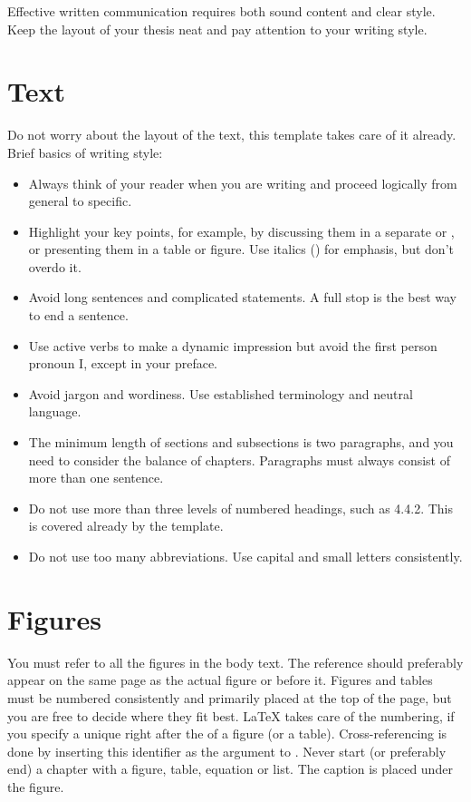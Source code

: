 Effective written communication requires both sound content and clear style. Keep the layout of your thesis neat and pay attention to your writing style.

\section{Text}

Do not worry about the layout of the text, this template takes care of it already. Brief basics of writing style:
\begin{itemize}
\item Always think of your reader when you are writing and proceed logically from general to specific.
\item Highlight your key points, for example, by discussing them in a separate  or , or presenting them in a table or figure. Use italics () for emphasis, but don’t overdo it.
\item Avoid long sentences and complicated statements. A full stop is the best way to end a sentence.
\item Use active verbs to make a dynamic impression but avoid the first person pronoun I, except in your preface.
\item Avoid jargon and wordiness. Use established terminology and neutral language.
\item The minimum length of sections and subsections is two paragraphs, and you need to consider the balance of chapters. Paragraphs must always consist of more than one sentence.
\item Do not use more than three levels of numbered headings, such as 4.4.2. This is covered already by the template.
\item Do not use too many abbreviations. Use capital and small letters consistently.
\end{itemize}

\section{Figures}

You must refer to all the figures in the body text. The reference should preferably appear on the same page as the actual figure or before it. Figures and tables must be numbered consistently and primarily placed at the top of the page, but you are free to decide where they fit best. \LaTeX{} takes care of the numbering, if you specify a unique  right after the  of a figure (or a table). Cross-referencing is done by inserting this identifier as the argument to . Never start (or preferably end) a chapter with a figure, table, equation or list. The caption is placed under the figure.

